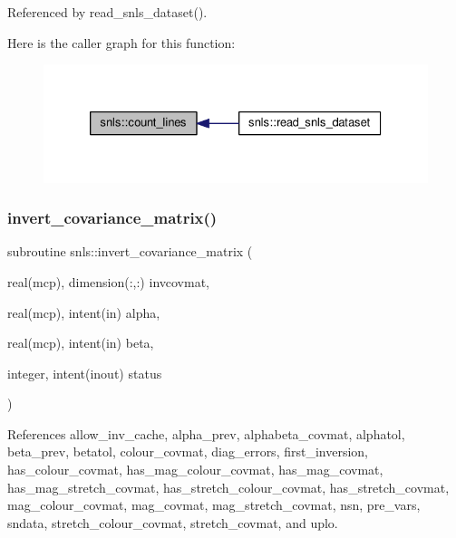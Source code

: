 Referenced by read\+\_\+snls\+\_\+dataset().

Here is the caller graph for this function\+:
\nopagebreak
\begin{figure}[H]
\begin{center}
\leavevmode
\includegraphics[width=326pt]{namespacesnls_a956019aee61f8e8b602d1b4edb635909_icgraph}
\end{center}
\end{figure}
\mbox{\label{namespacesnls_a46f1f0ddbecf69ac1dbfa16bfd6af020}} 
\subsubsection{\texorpdfstring{invert\+\_\+covariance\+\_\+matrix()}{invert\_covariance\_matrix()}}
{\footnotesize\ttfamily subroutine snls\+::invert\+\_\+covariance\+\_\+matrix (\begin{DoxyParamCaption}\item[{real(mcp), dimension(\+:,\+:)}]{invcovmat,  }\item[{real(mcp), intent(in)}]{alpha,  }\item[{real(mcp), intent(in)}]{beta,  }\item[{integer, intent(inout)}]{status }\end{DoxyParamCaption})\hspace{0.3cm}{\ttfamily [private]}}



References allow\+\_\+inv\+\_\+cache, alpha\+\_\+prev, alphabeta\+\_\+covmat, alphatol, beta\+\_\+prev, betatol, colour\+\_\+covmat, diag\+\_\+errors, first\+\_\+inversion, has\+\_\+colour\+\_\+covmat, has\+\_\+mag\+\_\+colour\+\_\+covmat, has\+\_\+mag\+\_\+covmat, has\+\_\+mag\+\_\+stretch\+\_\+covmat, has\+\_\+stretch\+\_\+colour\+\_\+covmat, has\+\_\+stretch\+\_\+covmat, mag\+\_\+colour\+\_\+covmat, mag\+\_\+covmat, mag\+\_\+stretch\+\_\+covmat, nsn, pre\+\_\+vars, sndata, stretch\+\_\+colour\+\_\+covmat, stretch\+\_\+covmat, and uplo.



